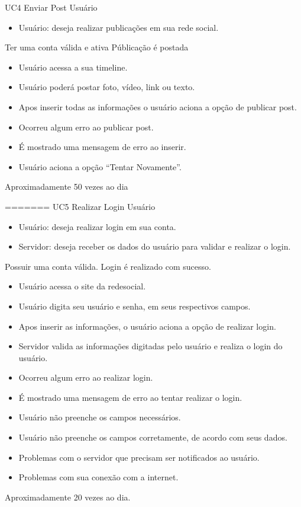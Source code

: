 \casoDeUso
{UC4}
{Enviar Post}
{Usuário}
{
\begin{itemize}
	\item Usuário: deseja realizar publicações em sua rede social.
\end{itemize}

}
{Ter uma conta válida e ativa}
{Públicação é postada}
{
\begin{itemize}
\item Usuário acessa a sua timeline.
\item Usuário poderá postar foto, vídeo, link ou texto.
\item Apos inserir todas as informações o usuário aciona a opção de publicar post.
\end{itemize}
}
{
\begin{itemize}
\item Ocorreu algum erro ao publicar post.
\item É mostrado uma mensagem de erro ao inserir.
\item Usuário aciona a opção “Tentar Novamente”.
\end{itemize}
}
{Aproximadamente 50 vezes ao dia}
{

}
=======
\casoDeUso
{UC5}
{Realizar Login}
{Usuário}
{
\begin{itemize}
	\item Usuário: deseja realizar login em sua conta.
	\item Servidor: deseja receber os dados do usuário para validar e realizar o login.
\end{itemize}

}
{Possuir uma conta válida.}
{Login é realizado com sucesso.}
{
\begin{itemize}
\item Usuário acessa o site da redesocial.
\item Usuário digita seu usuário e senha, em seus respectivos campos.
\item Apos inserir as informações, o usuário aciona a opção de realizar login.
\item Servidor valida as informações digitadas pelo usuário e realiza o login do usuário.
\end{itemize}
}
{
\begin{itemize}
\item Ocorreu algum erro ao realizar login.
\item É mostrado uma mensagem de erro ao tentar realizar o login.
\item Usuário não preenche os campos necessários.
\item Usuário não preenche os campos corretamente, de acordo com seus dados.
\item Problemas com o servidor que precisam ser notificados ao usuário.
\item Problemas com sua conexão com a internet.
\end{itemize}
}
{Aproximadamente 20 vezes ao dia.}
{

}
